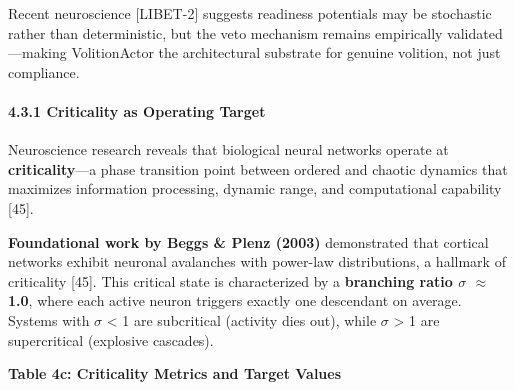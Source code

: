 \documentclass[
]{article}
\begin{document}
Recent neuroscience {[}LIBET-2{]} suggests readiness potentials may be
stochastic rather than deterministic, but the veto mechanism remains
empirically validated---making VolitionActor the architectural substrate
for genuine volition, not just compliance.

\hypertarget{criticality-as-operating-target}{%
\paragraph{4.3.1 Criticality as Operating
Target}\label{criticality-as-operating-target}}

Neuroscience research reveals that biological neural networks operate at
\textbf{criticality}---a phase transition point between ordered and
chaotic dynamics that maximizes information processing, dynamic range,
and computational capability {[}45{]}.

\textbf{Foundational work by Beggs \& Plenz (2003)} demonstrated that
cortical networks exhibit neuronal avalanches with power-law
distributions, a hallmark of criticality {[}45{]}. This critical state
is characterized by a \textbf{branching ratio $\sigma$ $\approx$ 1.0}, where each
active neuron triggers exactly one descendant on average. Systems with $\sigma$
\textless{} 1 are subcritical (activity dies out), while $\sigma$
\textgreater{} 1 are supercritical (explosive cascades).

\textbf{Table 4c: Criticality Metrics and Target Values}
\end{document}
